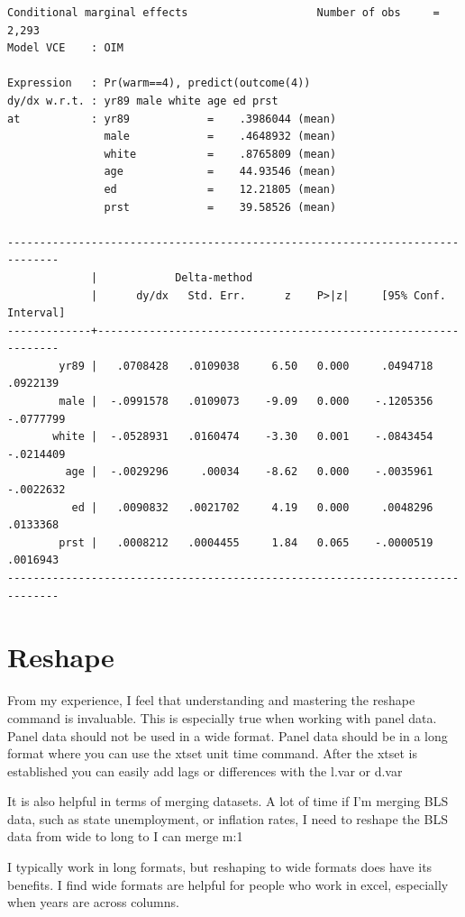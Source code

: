 \documentclass[
]{book}
\begin{document}
\begin{verbatim}
Conditional marginal effects                    Number of obs     =      2,293
Model VCE    : OIM

Expression   : Pr(warm==4), predict(outcome(4))
dy/dx w.r.t. : yr89 male white age ed prst
at           : yr89            =    .3986044 (mean)
               male            =    .4648932 (mean)
               white           =    .8765809 (mean)
               age             =    44.93546 (mean)
               ed              =    12.21805 (mean)
               prst            =    39.58526 (mean)

------------------------------------------------------------------------------
             |            Delta-method
             |      dy/dx   Std. Err.      z    P>|z|     [95% Conf. Interval]
-------------+----------------------------------------------------------------
        yr89 |   .0708428   .0109038     6.50   0.000     .0494718    .0922139
        male |  -.0991578   .0109073    -9.09   0.000    -.1205356   -.0777799
       white |  -.0528931   .0160474    -3.30   0.001    -.0843454   -.0214409
         age |  -.0029296     .00034    -8.62   0.000    -.0035961   -.0022632
          ed |   .0090832   .0021702     4.19   0.000     .0048296    .0133368
        prst |   .0008212   .0004455     1.84   0.065    -.0000519    .0016943
------------------------------------------------------------------------------
\end{verbatim}

\chapter{Reshape}\label{reshape}

From my experience, I feel that understanding and mastering the reshape command is invaluable. This is especially true when working with panel data. Panel data should not be used in a wide format. Panel data should be in a long format where you can use the xtset unit time command. After the xtset is established you can easily add lags or differences with the l.var or d.var

It is also helpful in terms of merging datasets. A lot of time if I'm merging BLS data, such as state unemployment, or inflation rates, I need to reshape the BLS data from wide to long to I can merge m:1

I typically work in long formats, but reshaping to wide formats does have its benefits. I find wide formats are helpful for people who work in excel, especially when years are across columns.
\end{document}
